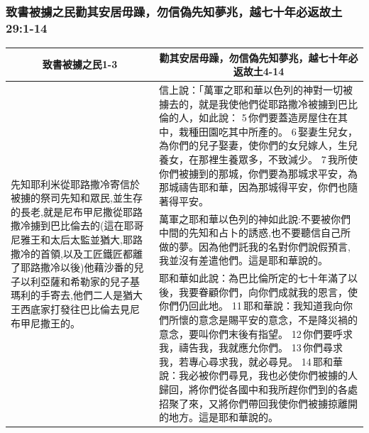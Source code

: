 \subsubsection{致書被擄之民勸其安居毋躁，勿信偽先知夢兆，越七十年必返故土 29:1-14}
\begin{table}[H]
\centering
\begin{tabular}{p{3.7cm}|p{13.50cm}}\hline\hline
\multicolumn{1}{c|}{致書被擄之民1-3}&\multicolumn{1}{c}{勸其安居毋躁，勿信偽先知夢兆，越七十年必返故土4-14}\\\hline
\multirow{3}{4.cm}{先知耶利米從耶路撒冷寄信於被擄的祭司先知和眾民,並生存的長老,就是尼布甲尼撒從耶路撒冷擄到巴比倫去的(這在耶哥尼雅王和太后太監並猶大,耶路撒冷的首領,以及工匠鐵匠都離了耶路撒冷以後)他藉沙番的兒子以利亞薩和希勒家的兒子基瑪利的手寄去,他們二人是猶大王西底家打發往巴比倫去見尼布甲尼撒王的。} 
&信上說：「萬軍之耶和華以色列的神對一切被擄去的，就是我使他們從耶路撒冷被擄到巴比倫的人，如此說： 5 你們要蓋造房屋住在其中，栽種田園吃其中所產的。 6 娶妻生兒女，為你們的兒子娶妻，使你們的女兒嫁人，生兒養女，在那裡生養眾多，不致減少。 7 我所使你們被擄到的那城，你們要為那城求平安，為那城禱告耶和華，因為那城得平安，你們也隨著得平安。\\\cline{2-2}

&萬軍之耶和華以色列的神如此說:不要被你們中間的先知和占卜的誘惑,也不要聽信自己所做的夢。因為他們託我的名對你們說假預言,我並沒有差遣他們。這是耶和華說的。\\\cline{2-2}
&耶和華如此說：為巴比倫所定的七十年滿了以後，我要眷顧你們，向你們成就我的恩言，使你們仍回此地。 11 耶和華說：我知道我向你們所懷的意念是賜平安的意念，不是降災禍的意念，要叫你們末後有指望。 12 你們要呼求我，禱告我，我就應允你們。 13 你們尋求我，若專心尋求我，就必尋見。 14 耶和華說：我必被你們尋見，我也必使你們被擄的人歸回，將你們從各國中和我所趕你們到的各處招聚了來，又將你們帶回我使你們被擄掠離開的地方。這是耶和華說的。\\\hline
\end{tabular}
\end{table}



